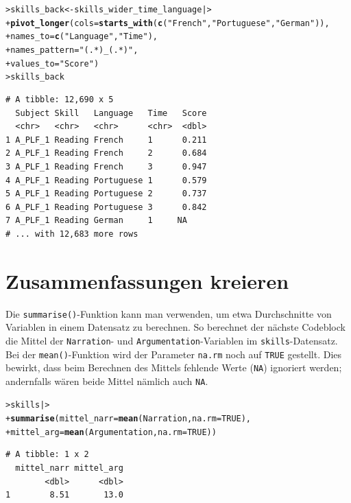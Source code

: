 \documentclass[oneside, 10pt]{book}\usepackage[]{graphicx}\usepackage[]{xcolor}
\makeatletter
\newcommand{\hlnum}[1]{\textcolor[rgb]{0.686,0.059,0.569}{#1}}%
\newcommand{\hlstr}[1]{\textcolor[rgb]{0.192,0.494,0.8}{#1}}%
\newcommand{\hlstd}[1]{\textcolor[rgb]{0.345,0.345,0.345}{#1}}%
\newcommand{\hlkwb}[1]{\textcolor[rgb]{0.69,0.353,0.396}{#1}}%
\newcommand{\hlkwc}[1]{\textcolor[rgb]{0.333,0.667,0.333}{#1}}%
\newcommand{\hlkwd}[1]{\textcolor[rgb]{0.737,0.353,0.396}{\textbf{#1}}}%
\newenvironment{kframe}{%
 \def\at@end@of@kframe{}%
 \ifinner\ifhmode%
  \def\at@end@of@kframe{\end{minipage}}%
  \begin{minipage}{\columnwidth}%
 \fi\fi%
 \def\FrameCommand##1{\hskip\@totalleftmargin \hskip-\fboxsep
 \colorbox{shadecolor}{##1}\hskip-\fboxsep
     \hskip-\linewidth \hskip-\@totalleftmargin \hskip\columnwidth}%
 \MakeFramed {\advance\hsize-\width
   \@totalleftmargin\z@ \linewidth\hsize
   \@setminipage}}%
 {\par\unskip\endMakeFramed%
 \at@end@of@kframe}
\newenvironment{knitrout}{}{} %
\makeatother
\begin{document}
\begin{knitrout}
\color{fgcolor}\begin{kframe}
\begin{alltt}
\hlstd{> }\hlstd{skills_back} \hlkwb{<-} \hlstd{skills_wider_time_language |>}
\hlstd{+ }  \hlkwd{pivot_longer}\hlstd{(}\hlkwc{cols} \hlstd{=} \hlkwd{starts_with}\hlstd{(}\hlkwd{c}\hlstd{(}\hlstr{"French"}\hlstd{,} \hlstr{"Portuguese"}\hlstd{,} \hlstr{"German"}\hlstd{)),}
\hlstd{+ }               \hlkwc{names_to} \hlstd{=} \hlkwd{c}\hlstd{(}\hlstr{"Language"}\hlstd{,} \hlstr{"Time"}\hlstd{),}
\hlstd{+ }               \hlkwc{names_pattern} \hlstd{=} \hlstr{"(.*)_(.*)"}\hlstd{,}
\hlstd{+ }               \hlkwc{values_to} \hlstd{=} \hlstr{"Score"}\hlstd{)}
\hlstd{> }\hlstd{skills_back}
\end{alltt}
\begin{verbatim}
# A tibble: 12,690 x 5
  Subject Skill   Language   Time   Score
  <chr>   <chr>   <chr>      <chr>  <dbl>
1 A_PLF_1 Reading French     1      0.211
2 A_PLF_1 Reading French     2      0.684
3 A_PLF_1 Reading French     3      0.947
4 A_PLF_1 Reading Portuguese 1      0.579
5 A_PLF_1 Reading Portuguese 2      0.737
6 A_PLF_1 Reading Portuguese 3      0.842
7 A_PLF_1 Reading German     1     NA    
# ... with 12,683 more rows
\end{verbatim}
\end{kframe}
\end{knitrout}

\section{Zusammenfassungen kreieren}
Die \texttt{summarise()}-Funktion kann man verwenden,
um etwa Durchschnitte von Variablen in einem Datensatz zu berechnen.
So berechnet der nächste Codeblock die Mittel der \texttt{Narration}-
und \texttt{Argumentation}-Variablen im \texttt{skills}-Datensatz.
Bei der \texttt{mean()}-Funktion wird der Parameter \texttt{na.rm}
noch auf \texttt{TRUE} gestellt. Dies bewirkt, dass beim Berechnen
des Mittels fehlende Werte (\texttt{NA}) ignoriert werden; 
andernfalls wären beide Mittel nämlich auch \texttt{NA}.

\begin{knitrout}
\color{fgcolor}\begin{kframe}
\begin{alltt}
\hlstd{> }\hlstd{skills |>}
\hlstd{+ }  \hlkwd{summarise}\hlstd{(}\hlkwc{mittel_narr} \hlstd{=} \hlkwd{mean}\hlstd{(Narration,} \hlkwc{na.rm} \hlstd{=} \hlnum{TRUE}\hlstd{),}
\hlstd{+ }            \hlkwc{mittel_arg} \hlstd{=} \hlkwd{mean}\hlstd{(Argumentation,} \hlkwc{na.rm} \hlstd{=} \hlnum{TRUE}\hlstd{))}
\end{alltt}
\begin{verbatim}
# A tibble: 1 x 2
  mittel_narr mittel_arg
        <dbl>      <dbl>
1        8.51       13.0
\end{verbatim}
\end{kframe}
\end{knitrout}
\end{document}
